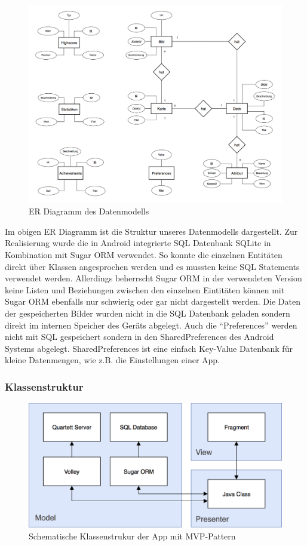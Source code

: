 \documentclass{scrartcl}
\begin{document}
\begin{figure}[h]
  \centering
  \includegraphics[width=\textwidth]{img/map_er.png}
  \caption{ER Diagramm des Datenmodells}
\end{figure}

\noindent
Im obigen ER Diagramm ist die Struktur unseres Datenmodells dargestellt. Zur
Realisierung wurde die in Android integrierte SQL Datenbank SQLite in
Kombination mit Sugar ORM verwendet. So konnte die einzelnen Entitäten direkt
über Klassen angesprochen werden und es mussten keine SQL Statements verwendet
werden. Allerdings beherrscht Sugar ORM in der verwendeten Version keine Listen
und Beziehungen zwischen den einzelnen Eintitäten können mit Sugar ORM ebenfalls
nur schwierig oder gar nicht dargestellt werden. Die Daten der gespeicherten
Bilder wurden nicht in die SQL Datenbank geladen sondern direkt im internen
Speicher des Geräts abgelegt. Auch die \enquote{Preferences} werden nicht mit
SQL gespeichert sondern in den SharedPreferences des Android Systems abgelegt.
SharedPreferences ist eine einfach Key-Value Datenbank für kleine Datenmengen,
wie z.B. die Einstellungen einer App.

\subsubsection{Klassenstruktur}

\begin{figure}[!ht]
  \centering
  \includegraphics[width=\textwidth]{img/class_structure.png}
  \caption{Schematische Klassenstrukur der App mit MVP-Pattern}
\end{figure}
\end{document}

